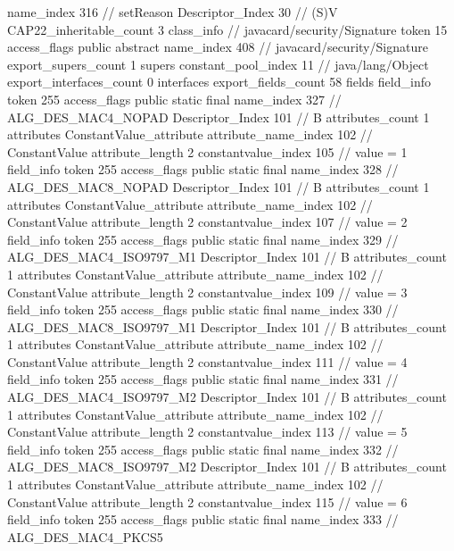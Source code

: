 {{{{{					name_index	316		// setReason
					Descriptor_Index	30		// (S)V
				}
			}
			CAP22_inheritable_count	3
		}
		class_info {		// javacard/security/Signature
			token	15
			access_flags	public abstract
			name_index	408		// javacard/security/Signature
			export_supers_count	1
			supers {
				constant_pool_index	11		// java/lang/Object
			}
			export_interfaces_count	0
			interfaces {
			}
			export_fields_count	58
			fields {
			field_info {
				token	255
				access_flags	public static final
				name_index	327		// ALG_DES_MAC4_NOPAD
				Descriptor_Index	101		// B
				attributes_count	1
				attributes {
				ConstantValue_attribute {
					attribute_name_index	102		// ConstantValue
					attribute_length	2
					constantvalue_index	105		// value = 1
				}
				}
			}
			field_info {
				token	255
				access_flags	public static final
				name_index	328		// ALG_DES_MAC8_NOPAD
				Descriptor_Index	101		// B
				attributes_count	1
				attributes {
				ConstantValue_attribute {
					attribute_name_index	102		// ConstantValue
					attribute_length	2
					constantvalue_index	107		// value = 2
				}
				}
			}
			field_info {
				token	255
				access_flags	public static final
				name_index	329		// ALG_DES_MAC4_ISO9797_M1
				Descriptor_Index	101		// B
				attributes_count	1
				attributes {
				ConstantValue_attribute {
					attribute_name_index	102		// ConstantValue
					attribute_length	2
					constantvalue_index	109		// value = 3
				}
				}
			}
			field_info {
				token	255
				access_flags	public static final
				name_index	330		// ALG_DES_MAC8_ISO9797_M1
				Descriptor_Index	101		// B
				attributes_count	1
				attributes {
				ConstantValue_attribute {
					attribute_name_index	102		// ConstantValue
					attribute_length	2
					constantvalue_index	111		// value = 4
				}
				}
			}
			field_info {
				token	255
				access_flags	public static final
				name_index	331		// ALG_DES_MAC4_ISO9797_M2
				Descriptor_Index	101		// B
				attributes_count	1
				attributes {
				ConstantValue_attribute {
					attribute_name_index	102		// ConstantValue
					attribute_length	2
					constantvalue_index	113		// value = 5
				}
				}
			}
			field_info {
				token	255
				access_flags	public static final
				name_index	332		// ALG_DES_MAC8_ISO9797_M2
				Descriptor_Index	101		// B
				attributes_count	1
				attributes {
				ConstantValue_attribute {
					attribute_name_index	102		// ConstantValue
					attribute_length	2
					constantvalue_index	115		// value = 6
				}
				}
			}
			field_info {
				token	255
				access_flags	public static final
				name_index	333		// ALG_DES_MAC4_PKCS5
}}}}}
